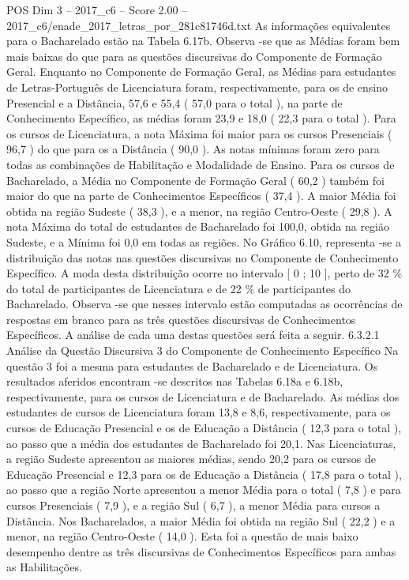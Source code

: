 \begin{textsample}{POS Dim 3 – 2017\_c6 – Score 2.00 – 2017\_c6/enade\_2017\_letras\_por\_281c81746d.txt}
As informações equivalentes para o Bacharelado estão na Tabela 6.17b.
Observa -se que as Médias foram bem mais baixas do que para as questões discursivas do Componente de Formação Geral.
Enquanto no Componente de Formação Geral, as Médias para estudantes de Letras-Português de Licenciatura foram, respectivamente, para os de ensino Presencial e a Distância, 57,6 e 55,4 ( 57,0 para o total ), na parte de Conhecimento Específico, as médias foram 23,9 e 18,0 ( 22,3 para o total ).
Para os cursos de Licenciatura, a nota Máxima foi maior para os cursos Presenciais ( 96,7 ) do que para os a Distância ( 90,0 ).
As notas mínimas foram zero para todas as combinações de Habilitação e Modalidade de Ensino.
Para os cursos de Bacharelado, a Média no Componente de Formação Geral ( 60,2 ) também foi maior do que na parte de Conhecimentos Específicos ( 37,4 ).
A maior Média foi obtida na região Sudeste ( 38,3 ), e a menor, na região Centro-Oeste ( 29,8 ).
A nota Máxima do total de estudantes de Bacharelado foi 100,0, obtida na região Sudeste, e a Mínima foi 0,0 em todas as regiões.
No Gráfico 6.10, representa -se a distribuição das notas nas questões discursivas no Componente de Conhecimento Específico.
A moda desta distribuição ocorre no intervalo [ 0 ; 10 ], perto de 32 \% do total de participantes de Licenciatura e de 22 \% de participantes do Bacharelado.
Observa -se que nesses intervalo estão computadas as ocorrências de respostas em branco para as três questões discursivas de Conhecimentos Específicos.
A análise de cada uma destas questões será feita a seguir. 6.3.2.1 Análise da Questão Discursiva 3 do Componente de Conhecimento Específico Na questão 3 foi a mesma para estudantes de Bacharelado e de Licenciatura.
Os resultados aferidos encontram -se descritos nas Tabelas 6.18a e 6.18b, respectivamente, para os cursos de Licenciatura e de Bacharelado.
As médias dos estudantes de cursos de Licenciatura foram 13,8 e 8,6, respectivamente, para os cursos de Educação Presencial e os de Educação a Distância ( 12,3 para o total ), ao passo que a média dos estudantes de Bacharelado foi 20,1.
Nas Licenciaturas, a região Sudeste apresentou as maiores médias, sendo 20,2 para os cursos de Educação Presencial e 12,3 para os de Educação a Distância ( 17,8 para o total ), ao passo que a região Norte apresentou a menor Média para o total ( 7,8 ) e para cursos Presenciais ( 7,9 ), e a região Sul ( 6,7 ), a menor Média para cursos a Distância.
Nos Bacharelados, a maior Média foi obtida na região Sul ( 22,2 ) e a menor, na região Centro-Oeste ( 14,0 ).
Esta foi a questão de mais baixo desempenho dentre as três discursivas de Conhecimentos Específicos para ambas as Habilitações.

\end{textsample}
